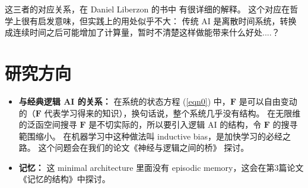 \documentclass[orivec]{llncs}
\newcommand{\emp}[1]{\textbf{\textcolor{Cerulean}{#1}}}
\newcommand{\vect}[1]{\boldsymbol{#1}}
\begin{document}

这三者的对应关系，在 Daniel Liberzon 的书中 \cite{Liberzon2012} 有很详细的解释。 这个对应在哲学上很有启发意味，但实践上的用处似乎不大： 传统 AI 是离散时间系统，转换成连续时间之后可能增加了计算量，暂时不清楚这样做能带来什么好处....？

\section{研究方向}

\begin{itemize}
\item \textbf{与经典逻辑 AI 的关系：} 在系统的状态方程 (\ref{eqn0}) 中，$\vect{F}$ 是可以自由变动的（$\vect{F}$ 代表学习得来的知识），换句话说，整个系统几乎没有结构。 在无限维的泛函空间搜寻 $\vect{F}$ 是不切实际的，所以要引入逻辑 AI 的结构，令 $\vect{F}$ 的搜寻範围缩小。 在机器学习中这种做法叫 inductive bias，是加快学习的必经之路。 这个问题会在我们的论文《神经与逻辑之间的桥》\cite{YanBridge} 探讨。

\item \textbf{记忆：}  这 minimal architecture 里面没有 episodic memory，这会在第3篇论文《记忆的结构》\cite{YanMemory}中探讨。

\end{itemize}


\end{document}
